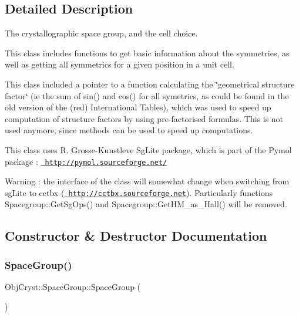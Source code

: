 \subsection{Detailed Description}
The crystallographic space group, and the cell choice. 

This class includes functions to get basic information about the symmetries, as well as getting all symmetrics for a given position in a unit cell.

This class included a pointer to a function calculating the \char`\"{}geometrical
 structure factor\char`\"{} (ie the sum of sin() and cos() for all symetrics, as could be found in the old version of the (red) International Tables), which was used to speed up computation of structure factors by using pre-\/factorised formulas. This is not used anymore, since methods can be used to speed up computations.

This class uses R. Grosse-\/\+Kunstleve \textquotesingle{}Sg\+Lite\textquotesingle{} package, which is part of the Pymol package \+: \href{http://pymol.sourceforge.net/}{\texttt{ http\+://pymol.\+sourceforge.\+net/}}

\begin{DoxyWarning}{Warning}
\+: the interface of the class will somewhat change when switching from sg\+Lite to cctbx (\href{http://cctbx.sourceforge.net}{\texttt{ http\+://cctbx.\+sourceforge.\+net}}). Particularly functions Spacegroup\+::\+Get\+Sg\+Ops() and Spacegroup\+::\+Get\+H\+M\+\_\+as\+\_\+\+Hall() will be removed. 
\end{DoxyWarning}


\subsection{Constructor \& Destructor Documentation}
\mbox{\label{class_obj_cryst_1_1_space_group_a5f5f5b814480e6ab109c22926cc359ca}} 
\subsubsection{\texorpdfstring{SpaceGroup()}{SpaceGroup()}\hspace{0.1cm}{\footnotesize\ttfamily [1/2]}}
{\footnotesize\ttfamily Obj\+Cryst\+::\+Space\+Group\+::\+Space\+Group (\begin{DoxyParamCaption}{ }\end{DoxyParamCaption})}

